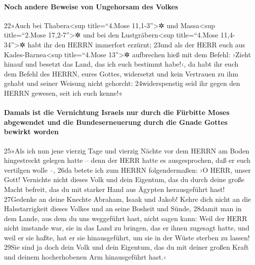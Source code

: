 \hypertarget{noch-andere-beweise-von-ungehorsam-des-volkes}{%
\paragraph{Noch andere Beweise von Ungehorsam des
Volkes}\label{noch-andere-beweise-von-ungehorsam-des-volkes}}

22»Auch bei Thabera\textless sup title=``4.Mose 11,1-3''\textgreater✲
und Massa\textless sup title=``2.Mose 17,2-7''\textgreater✲ und bei den
Lustgräbern\textless sup title=``4.Mose 11,4-34''\textgreater✲ habt ihr
den HERRN immerfort erzürnt; 23und als der HERR euch aus
Kades-Barnea\textless sup title=``4.Mose 13''\textgreater✲ aufbrechen
hieß mit dem Befehl: ›Zieht hinauf und besetzt das Land, das ich euch
bestimmt habe!‹, da habt ihr euch dem Befehl des HERRN, eures Gottes,
widersetzt und kein Vertrauen zu ihm gehabt und seiner Weisung nicht
gehorcht: 24widerspenstig seid ihr gegen den HERRN gewesen, seit ich
euch kenne!«

\hypertarget{damals-ist-die-vernichtung-israels-nur-durch-die-fuxfcrbitte-moses-abgewendet-und-die-bundeserneuerung-durch-die-gnade-gottes-bewirkt-worden}{%
\paragraph{Damals ist die Vernichtung Israels nur durch die Fürbitte
Moses abgewendet und die Bundeserneuerung durch die Gnade Gottes bewirkt
worden}\label{damals-ist-die-vernichtung-israels-nur-durch-die-fuxfcrbitte-moses-abgewendet-und-die-bundeserneuerung-durch-die-gnade-gottes-bewirkt-worden}}

25»Als ich nun jene vierzig Tage und vierzig Nächte vor dem HERRN am
Boden hingestreckt gelegen hatte -- denn der HERR hatte es
ausgesprochen, daß er euch vertilgen wolle --, 26da betete ich zum HERRN
folgendermaßen: ›O HERR, unser Gott! Vernichte nicht dieses Volk und
dein Eigentum, das du durch deine große Macht befreit, das du mit
starker Hand aus Ägypten herausgeführt hast! 27Gedenke an deine Knechte
Abraham, Isaak und Jakob! Kehre dich nicht an die Halsstarrigkeit dieses
Volkes und an seine Bosheit und Sünde, 28damit man in dem Lande, aus dem
du uns weggeführt hast, nicht sagen kann: Weil der HERR nicht imstande
war, sie in das Land zu bringen, das er ihnen zugesagt hatte, und weil
er sie haßte, hat er sie hinausgeführt, um sie in der Wüste sterben zu
lassen! 29Sie sind ja doch dein Volk und dein Eigentum, das du mit
deiner großen Kraft und deinem hocherhobenen Arm hinausgeführt hast.‹

